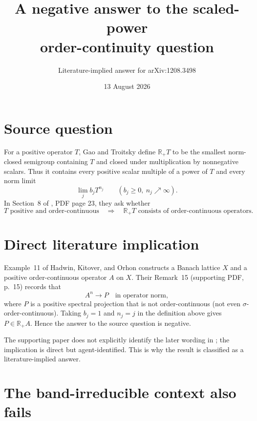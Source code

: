 \documentclass[11pt]{article}
\title{A negative answer to the scaled-power\\order-continuity question}
\author{Literature-implied answer for arXiv:1208.3498}
\date{13 August 2026}
\newcommand{\R}{\mathbb R}
\begin{document}
\maketitle

\begin{center}
\end{center}

\section{Source question}

For a positive operator $T$, Gao and Troitsky define $\R_+T$ to be the
smallest norm-closed semigroup containing $T$ and closed under multiplication
by nonnegative scalars.  Thus it contains every positive scalar multiple of
a power of $T$ and every norm limit
\[
             \lim_j b_jT^{n_j}\qquad(b_j\geq0,\ n_j\nearrow\infty).
\]
In Section~8 of \cite{GT}, PDF page 23, they ask whether
\[
 T\text{ positive and order-continuous}
 \quad\Longrightarrow\quad
 \R_+T\text{ consists of order-continuous operators}.
\]

\section{Direct literature implication}

Example~11 of Hadwin, Kitover, and Orhon \cite{HKO} constructs a Banach
lattice $X$ and a positive order-continuous operator $A$ on $X$.  Their
Remark~15 (supporting PDF, p.~15) records that
\[
                 A^n\longrightarrow P
                 \quad\text{in operator norm},
\]
where $P$ is a positive spectral projection that is not order-continuous
(not even $\sigma$-order-continuous).  Taking $b_j=1$ and $n_j=j$ in the
definition above gives $P\in\R_+A$.  Hence the answer to the source question
is negative.

The supporting paper does not explicitly identify the later wording in
\cite{GT}; the implication is direct but agent-identified.  This is why the
result is classified as a literature-implied answer.

\section{The band-irreducible context also fails}
\end{document}
